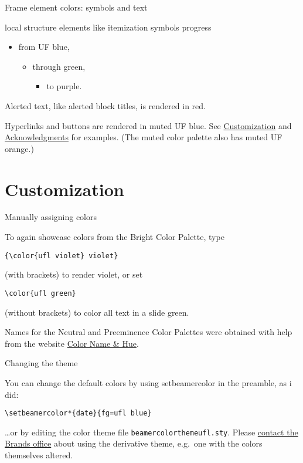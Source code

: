 \documentclass{beamer}
\begin{document}
\begin{frame}{Frame element colors: symbols and text}

{\ttfamily local structure} elements like itemization symbols progress
\begin{itemize}
\item from UF blue,
\begin{itemize}
\item through green,
\begin{itemize}
\item to purple.
\end{itemize}
\end{itemize}
\end{itemize}

\alert{Alerted text, like alerted block titles, is rendered in red.}

\vfill
Hyperlinks and buttons are rendered in muted UF blue.
See \hyperlink{sec:customization}{Customization} and \hyperlink{slide:acknowledgments}{Acknowledgments} for examples.
(The muted color palette also has muted UF orange.)

\end{frame}


\section{Customization}
\label{sec:customization}


\begin{frame}[fragile]{Manually assigning colors}

To again showcase colors from the Bright Color Palette, type
\begin{verbatim}
{\color{ufl violet} violet}
\end{verbatim}
(with brackets) to render {\color{ufl violet} violet}, or set
\begin{verbatim}
\color{ufl green}
\end{verbatim}
\color{ufl green}
(without brackets) to color all text in a slide green.

\color{black}\vfill
Names for the Neutral and Preeminence Color Palettes were obtained with help from the website \href{https://www.color-blindness.com/color-name-hue/}{Color Name \& Hue}.

\center\href{http://identity.ufl.edu/color/}{}

\end{frame}


\begin{frame}[fragile]{Changing the theme}

You can change the default colors by using setbeamercolor in the preamble, as i did:
\begin{verbatim}
\setbeamercolor*{date}{fg=ufl blue}
\end{verbatim}
\ldots or by editing the color theme file {\tt beamercolorthemeufl.sty}.
Please \hyperlink{http://identity.ufl.edu/support/contact/}{contact the Brands office} about using the derivative theme, e.g.\ one with the colors themselves altered.

\end{frame}
\end{document}
